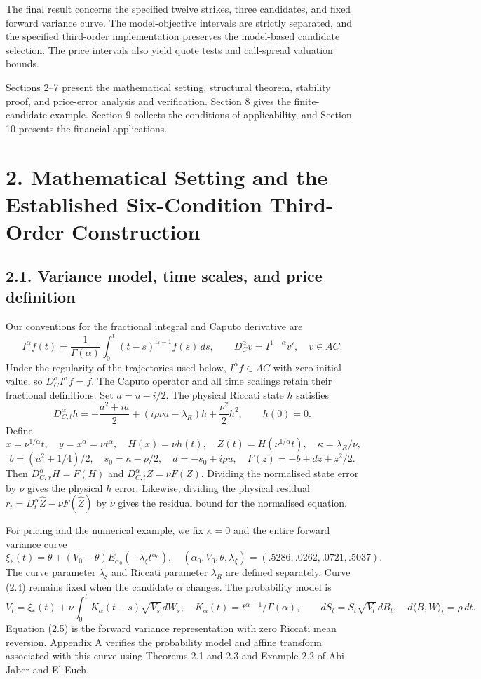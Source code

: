 \documentclass[a4paper,11pt]{article}
\begin{document}
The final result concerns the specified twelve strikes, three candidates, and fixed forward variance curve. The model-objective intervals are strictly separated, and the specified third-order implementation preserves the model-based candidate selection. The price intervals also yield quote tests and call-spread valuation bounds.

Sections 2–7 present the mathematical setting, structural theorem, stability proof, and price-error analysis and verification. Section 8 gives the finite-candidate example. Section 9 collects the conditions of applicability, and Section 10 presents the financial applications.

\section*{2. Mathematical Setting and the Established Six-Condition Third-Order Construction}

\subsection*{2.1. Variance model, time scales, and price definition}

Our conventions for the fractional integral and Caputo derivative are
\[
I^\alpha f(t)=\frac1{\Gamma(\alpha)}\int_0^t(t-s)^{\alpha-1}f(s)\,ds,
\qquad D_C^\alpha v=I^{1-\alpha}v',\quad v\in AC.
\tag{2.1}
\]
Under the regularity of the trajectories used below, \(I^\alpha f\in AC\) with zero initial value, so \(D_C^\alpha I^\alpha f=f\). The Caputo operator and all time scalings retain their fractional definitions. Set \(a=u-i/2\). The physical Riccati state \(h\) satisfies
\[
D_{C,t}^\alpha h=-\frac{a^2+ia}{2}
 +(i\rho\nu a-\lambda_R)h+\frac{\nu^2}{2}h^2,\qquad h(0)=0.
\tag{2.2}
\]
Define
\[
x=\nu^{1/\alpha}t,\quad y=x^\alpha=\nu t^\alpha,\quad
H(x)=\nu h(t),\quad Z(t)=H(\nu^{1/\alpha}t),\quad
\kappa=\lambda_R/\nu,
\tag{2.3}
\]
\[
b=(u^2+1/4)/2,\quad s_0=\kappa-\rho/2,\quad d=-s_0+i\rho u,\quad
F(z)=-b+dz+z^2/2.
\]
Then \(D_{C,x}^\alpha H=F(H)\) and \(D_{C,t}^\alpha Z=\nu F(Z)\). Dividing the normalised state error by \(\nu\) gives the physical \(h\) error. Likewise, dividing the physical residual \(r_t=D_t^\alpha\widehat Z-\nu F(\widehat Z)\) by \(\nu\) gives the residual bound for the normalised equation.

For pricing and the numerical example, we fix \(\kappa=0\) and the entire forward variance curve
\[
\xi_*(t)=\theta+(V_0-\theta)E_{\alpha_0}(-\lambda_\xi t^{\alpha_0}),
\quad
(\alpha_0,V_0,\theta,\lambda_\xi)=(.5286,.0262,.0721,.5037).
\tag{2.4}
\]
The curve parameter \(\lambda_\xi\) and Riccati parameter \(\lambda_R\) are defined separately. Curve (2.4) remains fixed when the candidate \(\alpha\) changes. The probability model is
\[
V_t=\xi_*(t)+\nu\int_0^tK_\alpha(t-s)\sqrt{V_s}\,dW_s,\quad
K_\alpha(t)=t^{\alpha-1}/\Gamma(\alpha),\qquad
dS_t=S_t\sqrt{V_t}\,dB_t,\quad d\langle B,W\rangle_t=\rho\,dt.
\tag{2.5}
\]
Equation (2.5) is the forward variance representation with zero Riccati mean reversion. Appendix A verifies the probability model and affine transform associated with this curve using Theorems 2.1 and 2.3 and Example 2.2 of Abi Jaber and El Euch.
\end{document}
